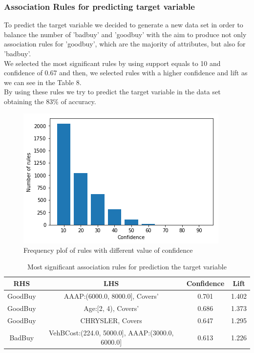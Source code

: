 \documentclass{article}
\begin{document}
	
	
	
	
	\subsubsection{Association Rules for predicting target variable}
	To predict the target variable we decided to generate a new data set in order to balance the number of 'badbuy' and 'goodbuy' with the aim to produce not only association rules for 'goodbuy', which are the majority of attributes, but also for 'badbuy'.\\
	We selected the most significant rules  by using support equals to 10 and confidence of 0.67 and then, we selected rules with  a higher confidence and lift as we can see in the Table 8.\\
	By using these rules we try to predict the target variable in the data set obtaining the 83\% of accuracy.\\
	
	\begin{figure}[H]
		\centering
		\includegraphics[width=.49\textwidth]{rules.png}
		\caption{Frequency plof of rules with different value of confidence}
		\label{fig:hyper_rf_us}
	\end{figure}
	
	
	
	
	\begin{table}[H]
		\centering
		\begin{tabular}{|cc|cc|}
			\hline
			\textbf{RHS} & \textbf{LHS} & \textbf{Confidence} & \textbf{Lift} \\
			\hline
			\rowcolor{Gray}
			GoodBuy & AAAP:(6000.0, 8000.0], Covers'  & 0.701 & 1.402 \\
			GoodBuy & Age:[2, 4), Covers' & 0.686 & 1.373 \\
			\rowcolor{Gray}
			GoodBuy &  CHRYSLER, Covers &  0.647 & 1.295 \\
			BadBuy &  VehBCost:(224.0, 5000.0], AAAP:(3000.0, 6000.0] & 0.613 & 1.226\\
			\hline
		\end{tabular}
		\caption{Most significant association rules for prediction the target variable}
	\end{table}
	
\end{document}
